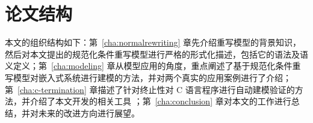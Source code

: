 \section{论文结构}

本文的组织结构如下：第~\ref{cha:normalrewriting} 章先介绍重写模型的背景知识，然后对本文提出的规范化条件重写模型进行严格的形式化描述，包括它的语法及语义定义；第~\ref{cha:modeling} 章从模型应用的角度，重点阐述了基于规范化条件重写模型对嵌入式系统进行建模的方法，并对两个真实的应用案例进行了介绍；第~\ref{cha:c-termination} 章描述了针对终止性对 C 语言程序进行自动建模验证的方法，并介绍了本文开发的相关工具 \CTerm；第~\ref{cha:conclusion} 章对本文的工作进行总结，并对未来的改进方向进行展望。 
